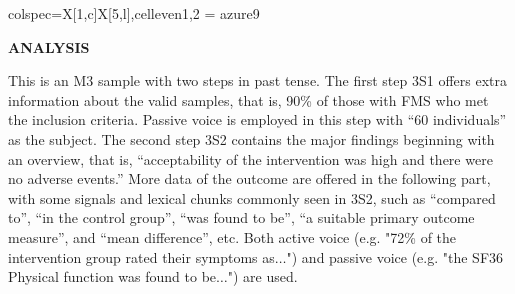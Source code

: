 \documentclass{ctexbook}
\begin{document}
\begin{sample}[label={myautocounter}]{\heiti}
{\begin{tblr}{colspec={X[1,c]X[5,l]},cell{even}{1,2} = {azure9}}
    \bottomrule
  \end{tblr}
  }

  \noindent \textbf{ANALYSIS}

  This is an M3 sample with two steps in past tense. The first step 3S1 offers extra information about the valid samples, that is, 90\% of those with FMS who met the inclusion criteria. Passive voice is employed in this step with ``60 individuals'' as the subject. The second step 3S2 contains the major findings beginning with an overview, that is, ``acceptability of the intervention was high and there were no adverse events.'' More data of the outcome are offered in the following part, with some signals and lexical chunks commonly seen in 3S2, such as ``compared to'', ``in the control group'', ``was found to be'', ``a suitable primary outcome measure'', and ``mean difference'', etc. Both active voice (e.g. "72\% of the intervention group rated their symptoms as$\dots$") and passive voice (e.g. "the SF36 Physical function was found to be$\dots$") are used.

\end{sample}
\end{document}
